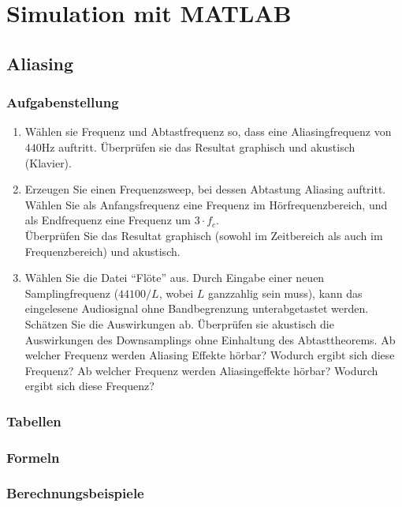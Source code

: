 \section{Simulation mit MATLAB}

%
%
\subsection{Aliasing}
\subsubsection{Aufgabenstellung}
\begin{enumerate}
\item Wählen sie Frequenz und Abtastfrequenz so, dass eine Aliasingfrequenz von $440$Hz auftritt. Überprüfen sie das Resultat graphisch und akustisch (Klavier).
\item Erzeugen Sie einen Frequenzsweep, bei dessen Abtastung Aliasing auftritt. Wählen Sie als Anfangsfrequenz eine Frequenz im Hörfrequenzbereich, und als Endfrequenz eine Frequenz um $3 \cdot f_c$. \\
Überprüfen Sie das Resultat graphisch (sowohl im Zeitbereich als auch im Frequenzbereich) und akustisch. 
\item Wählen Sie die Datei ``Flöte'' aus. Durch Eingabe einer neuen Samplingfrequenz ($44100/L$, wobei $L$ ganzzahlig sein muss), kann das eingelesene Audiosignal ohne Bandbegrenzung unterabgetastet werden. Schätzen Sie die Auswirkungen ab. Überprüfen sie akustisch die Auswirkungen des Downsamplings ohne Einhaltung des Abtasttheorems. Ab welcher Frequenz werden Aliasing Effekte hörbar? Wodurch ergibt sich diese Frequenz? Ab welcher Frequenz werden Aliasingeffekte hörbar? Wodurch ergibt sich diese Frequenz?
\end{enumerate}



\subsubsection{Tabellen}

\subsubsection{Formeln}

\subsubsection{Berechnungsbeispiele}

